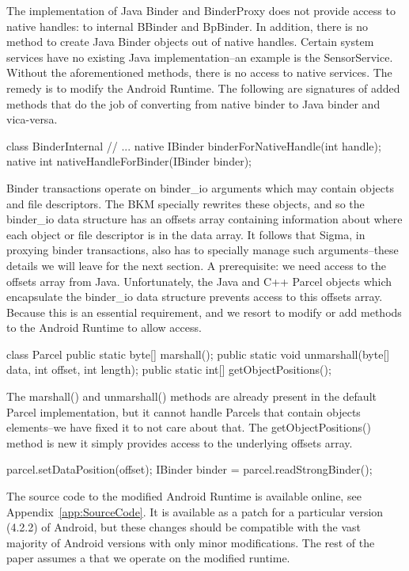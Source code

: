 \documentclass[prodmode]{acmlarge}
\begin{document}
The implementation of Java Binder and BinderProxy does not provide access to native handles: to internal BBinder and BpBinder. In addition, there is no method to create Java Binder objects out of native handles. Certain system services have no existing Java implementation--an example is the SensorService. Without the aforementioned methods, there is no access to native services. The remedy is to modify the Android Runtime. The following are signatures of added methods that do the job of converting from native binder to Java binder and vica-versa.

\begin{snippet}
class BinderInternal {
  // ...
  native IBinder binderForNativeHandle(int handle);
  native int nativeHandleForBinder(IBinder binder);
}
\end{snippet}

Binder transactions operate on binder\_io arguments which may contain objects and file descriptors. The BKM specially rewrites these objects, and so the binder\_io data structure has an offsets array containing information about where each object or file descriptor is in the data array. It follows that Sigma, in proxying binder transactions, also has to specially manage such arguments--these details we will leave for the next section. A prerequisite: we need access to the offsets array from Java. Unfortunately, the Java and C++ Parcel objects which encapsulate the binder\_io data structure prevents access to this offsets array. Because this is an essential requirement, and we resort to modify or add methods to the Android Runtime to allow access.

\begin{snippet}
class Parcel {
  public static byte[] marshall();
  public static void unmarshall(byte[] data, int offset, int length);
  public static int[] getObjectPositions();
}
\end{snippet}

The marshall() and unmarshall() methods are already present in the default Parcel implementation, but it cannot handle Parcels that contain objects elements--we have fixed it to not care about that. The getObjectPositions() method is new it simply provides access to the underlying offsets array.

\begin{snippet}
parcel.setDataPosition(offset);
IBinder binder = parcel.readStrongBinder();
\end{snippet}

The source code to the modified Android Runtime is available online, see Appendix~\ref{app:SourceCode}. It is available as a patch for a particular version (4.2.2) of Android, but these changes should be compatible with the vast majority of Android versions with only minor modifications. The rest of the paper assumes a that we operate on the modified runtime.
\end{document}

